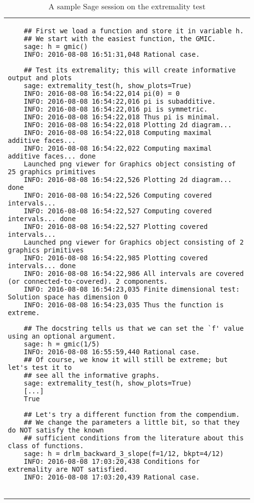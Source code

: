 \documentclass[10pt,reqno]{amsart}
\begin{document}
\setcounter{table}{2}
\begin{table}
  \caption{A sample Sage session on the extremality test}
  \label{tab:extremality_test}
  \tiny %
  \begin{tabular}{@{}p{\linewidth}@{}}
    \toprule
	\begin{verbatim}
	## First we load a function and store it in variable h.
	## We start with the easiest function, the GMIC.
	sage: h = gmic()
	INFO: 2016-08-08 16:51:31,048 Rational case.
	
	## Test its extremality; this will create informative output and plots
	sage: extremality_test(h, show_plots=True)
	INFO: 2016-08-08 16:54:22,014 pi(0) = 0
	INFO: 2016-08-08 16:54:22,016 pi is subadditive.
	INFO: 2016-08-08 16:54:22,016 pi is symmetric.
	INFO: 2016-08-08 16:54:22,018 Thus pi is minimal.
	INFO: 2016-08-08 16:54:22,018 Plotting 2d diagram...
	INFO: 2016-08-08 16:54:22,018 Computing maximal additive faces...
	INFO: 2016-08-08 16:54:22,022 Computing maximal additive faces... done
	Launched png viewer for Graphics object consisting of 25 graphics primitives
	INFO: 2016-08-08 16:54:22,526 Plotting 2d diagram... done
	INFO: 2016-08-08 16:54:22,526 Computing covered intervals...
	INFO: 2016-08-08 16:54:22,527 Computing covered intervals... done
	INFO: 2016-08-08 16:54:22,527 Plotting covered intervals...
	Launched png viewer for Graphics object consisting of 2 graphics primitives
	INFO: 2016-08-08 16:54:22,985 Plotting covered intervals... done
	INFO: 2016-08-08 16:54:22,986 All intervals are covered (or connected-to-covered). 2 components.
	INFO: 2016-08-08 16:54:23,035 Finite dimensional test: Solution space has dimension 0
	INFO: 2016-08-08 16:54:23,035 Thus the function is extreme.
	
	## The docstring tells us that we can set the `f' value using an optional argument.
	sage: h = gmic(1/5)
	INFO: 2016-08-08 16:55:59,440 Rational case.
	## Of course, we know it will still be extreme; but let's test it to
	## see all the informative graphs.
	sage: extremality_test(h, show_plots=True)
	[...]
	True

	## Let's try a different function from the compendium. 
	## We change the parameters a little bit, so that they do NOT satisfy the known
	## sufficient conditions from the literature about this class of functions.
	sage: h = drlm_backward_3_slope(f=1/12, bkpt=4/12)
	INFO: 2016-08-08 17:03:20,438 Conditions for extremality are NOT satisfied.
	INFO: 2016-08-08 17:03:20,439 Rational case.
	

\end{verbatim}
\end{tabular}
\end{table}
\end{document}
